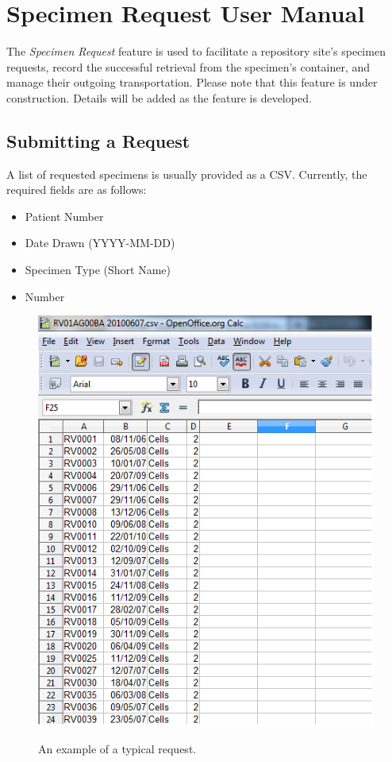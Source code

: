 \chapter{Specimen Request User Manual}

The \emph{Specimen Request} feature is used to facilitate a repository site's specimen requests, record the successful retrieval from the specimen's container, and manage their outgoing transportation. Please note that this feature is under construction. Details will be added as the feature is developed.

\section{Submitting a Request}

A list of requested specimens is usually provided as a CSV.  Currently, the required fields are as follows:

\begin{itemize}
\item Patient Number
\item Date Drawn (YYYY-MM-DD)
\item Specimen Type (Short Name)
\item Number
\end{itemize}

\begin{figure}[H]
      \centering
      \scalebox{0.5}
      { \includegraphics*{screenshots/specimen_request/csv.png} }
      \caption{An example of a typical request.}
      \label{Prepare CSV}
\end{figure}

